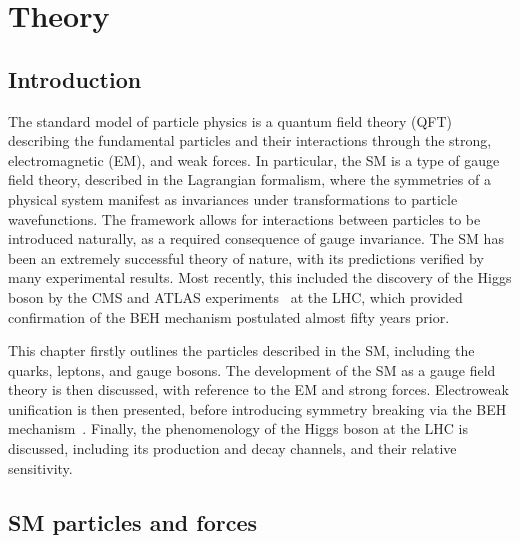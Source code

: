 \chapter{Theory}
\label{chap:theory}

\section{Introduction}


The standard model of particle physics is a quantum field theory (QFT) describing the fundamental particles and their interactions through the strong, electromagnetic (EM), and weak forces. In particular, the SM is a type of gauge field theory, described in the Lagrangian formalism, where the symmetries of a physical system manifest as invariances under transformations to particle wavefunctions. The framework allows for interactions between particles to be introduced naturally, as a required consequence of gauge invariance.
The SM has been an extremely successful theory of nature, with its predictions verified by many experimental results. Most recently, this included the discovery of the Higgs boson by the CMS and ATLAS experiments~\cite{Aad:2012tfa,Chatrchyan:2012xdj,Chatrchyan:2013lba} at the LHC, which provided confirmation of the BEH mechanism postulated almost fifty years prior. 

This chapter firstly outlines the particles described in the SM, including the quarks, leptons, and gauge bosons. The development of the SM as a gauge field theory is then discussed, with reference to the EM and strong forces. Electroweak unification is then presented, before introducing symmetry breaking via the BEH mechanism~\cite{BroutEnglert,HiggsBS1,HiggsBS2,HiggsBS3,Kibble}. Finally, the phenomenology of the Higgs boson at the LHC is discussed, including its production and decay channels, and their relative sensitivity.

\section{SM particles and forces}


